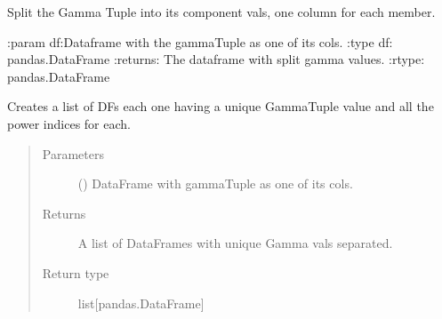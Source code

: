 \documentclass[letterpaper,10pt,openany,oneside,english]{sphinxmanual}
\begin{document}
\begin{fulllineitems}
\label{\detokenize{index:loadPullDataAnalysis.dataXformation.splitGammaTuple}}
\sphinxAtStartPar
Split the Gamma Tuple into its component vals, one column for each member.

\sphinxAtStartPar
:param df:Dataframe with the gammaTuple as one of its cols.
:type df: pandas.DataFrame
:returns: The dataframe with split gamma values.
:rtype: pandas.DataFrame

\end{fulllineitems}


\begin{fulllineitems}
\label{\detokenize{index:loadPullDataAnalysis.dataXformation.splitOnUniqueGammaTuples}}
\sphinxAtStartPar
Creates a list of DFs each one having a unique GammaTuple value and
all the power indices for each.
\begin{quote}\begin{description}
\item[{Parameters}] \leavevmode
\sphinxAtStartPar
{} () \textendash{} DataFrame with gammaTuple as one of its cols.

\item[{Returns}] \leavevmode
\sphinxAtStartPar
A list of DataFrames with unique Gamma vals separated.

\item[{Return type}] \leavevmode
\sphinxAtStartPar
list{[}pandas.DataFrame{]}

\end{description}\end{quote}

\end{fulllineitems}
\end{document}

